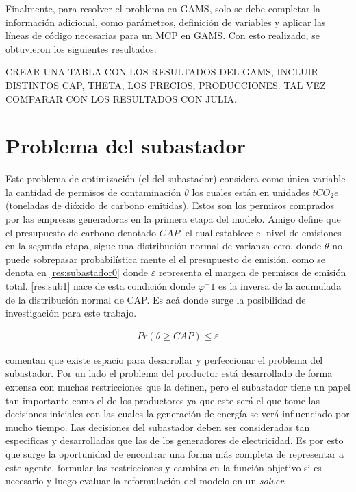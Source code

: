 Finalmente, para resolver el problema en GAMS, solo se debe completar la información adicional, como parámetros, definición de variables y aplicar las líneas de código necesarias para un MCP en GAMS. Con esto realizado, se obtuvieron los siguientes resultados:
\vspace{2.5mm}

CREAR UNA TABLA CON LOS RESULTADOS DEL GAMS, INCLUIR DISTINTOS CAP, THETA, LOS PRECIOS, PRODUCCIONES. 
TAL VEZ COMPARAR CON LOS RESULTADOS CON JULIA.

\section{Problema del subastador}

Este problema de optimización (el del subastador) considera como única variable la cantidad de permisos de contaminación $\theta$ los cuales están en unidades $tCO_2 e$ (toneladas de dióxido de carbono emitidas). Estos son los permisos comprados por las empresas generadoras en la primera etapa del modelo. Amigo define que el presupuesto de carbono denotado $CAP$, el cual establece el nivel de emisiones en la segunda etapa, sigue una distribución normal de varianza cero, donde $\theta$ no puede sobrepasar probabilística mente el el presupuesto de emisión, como se denota en \ref{res:subastador0} donde $\varepsilon$ representa el margen de permisos de emisión total. \ref{res:sub1} nace de esta condición donde $\varphi^-1$ es la inversa de la acumulada de la distribución normal de CAP. Es acá donde surge la posibilidad de investigación para este trabajo. 
\vspace{2.5mm}

\begin{equation}
\begin{array}{cl}
    Pr(\theta \geq CAP)\leq \varepsilon \label{res:subastador0}
\end{array}
\end{equation}
\vspace{2.5mm}

 comentan que existe espacio para desarrollar y perfeccionar el problema del subastador. Por un lado el problema del productor está desarrollado de forma extensa con muchas restricciones que la definen, pero el subastador tiene un papel tan importante como el de los productores ya que este será el que tome las decisiones iniciales con las cuales la generación de energía se verá influenciado por mucho tiempo. Las decisiones del subastador deben ser consideradas tan especificas y desarrolladas que las de los generadores de electricidad. Es por esto que surge la oportunidad de encontrar una forma más completa de representar a este agente, formular las restricciones y cambios en la función objetivo si es necesario y luego evaluar la reformulación del modelo en un \textit{solver}.

